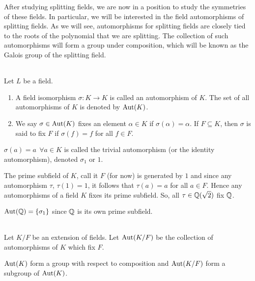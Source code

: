 After studying splitting fields, we are now in a position to study the symmetries of these fields. In particular, we will be interested in the field automorphisms of splitting fields. As we will see, automorphisms for splitting fields are closely tied to the roots of the polynomial that we are splitting. The collection of such automorphisms will form a group under composition, which will be known as the Galois group of the splitting field.

\begin{definition} \leavevmode \\
    Let $L$ be a field.
    \begin{enumerate}
        \item A field isomorphism $\sigma: K \to K$ is called an automorphism of $K$. The set of all automorphisms of $K$ is denoted by $\text{Aut}(K)$.
        \item We say $\sigma \in \text{Aut}(K)$ fixes an element $\alpha \in K$ if $\sigma(\alpha) = \alpha$. If $F\subseteq K$, then $\sigma$ is said to fix $F$ if $\sigma(f) = f$ for all $f \in F$.
    \end{enumerate}
\end{definition}

\begin{example}
    $\sigma(a) = a ~~\forall a \in K$ is called the trivial automorphism (or the identity automorphism), denoted $\sigma_1$ or $1$.
\end{example}

\begin{note}
    The prime subfield of $K$, call it $F$ (for now) is generated by $1$ and since any automorphism $\tau$, $\tau(1)=1$, it follows that $\tau(a) = a$ for all $a\in F$. Hence any automorphisms of a field $K$ fixes its prime subfield. So, all $\tau \in \mathbb{Q}(\sqrt{2})$ fix $\mathbb{Q}$.
\end{note}

\begin{example}
    $\text{Aut}(\mathbb{Q}) = \left\{\sigma_1\right\}$ since $\mathbb{Q}$ is its own prime subfield.
\end{example}

\begin{definition} [$\Aut{K/F}$] \leavevmode \\
    Let $K / F$ be an extension of fields. Let $\Aut{K/F}$ be the collection of automorphisms of $K$ which fix $F$.
\end{definition}

\begin{proposition}
    $\text{Aut}(K)$ form a group with respect to composition and $\Aut{K/F}$ form a subgroup of $\text{Aut}(K)$.
\end{proposition}

